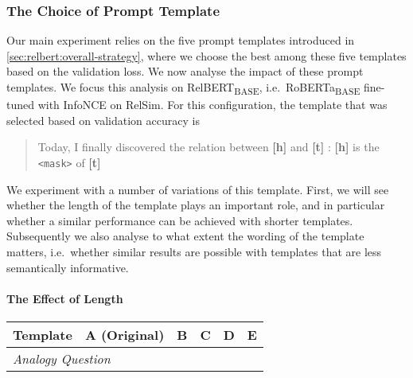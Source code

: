\documentclass[3p]{elsarticle}
\begin{document}
{\subsubsection{The Choice of Prompt Template}\label{sec:relbert:the-effect-of-template}
Our main experiment relies on the five prompt templates introduced in \autoref{sec:relbert:overall-strategy}, where we choose the best among these five templates based on the validation loss. We now analyse the impact of these prompt templates. We focus this analysis on RelBERT\textsubscript{BASE}, i.e.\ RoBERTa\textsubscript{BASE} fine-tuned with InfoNCE on RelSim. For this configuration, the template that was selected based on validation accuracy is
\begin{quote}
Today, I finally discovered the relation between \textbf{[h]} and \textbf{[t]} : \textbf{[h]} is the \texttt{<mask>} of \textbf{[t]}
\end{quote}
We experiment with a number of variations of this template. First, we will see whether the length of the template plays an important role, and in particular whether a similar performance can be achieved with shorter templates. Subsequently we also analyse to what extent the wording of the template matters, i.e.\ whether similar results are possible with templates that are less semantically informative.

\paragraph{The Effect of Length} 

\begin{table}[!t]
\centering
\begin{tabular}{lccccc}
\toprule
Template   & A (Original)             & B             & C             & D             & E    \\ \midrule
\multicolumn{3}{l}{\textit{Analogy Question}} \\      


\end{tabular}
\end{table}}
\end{document}
